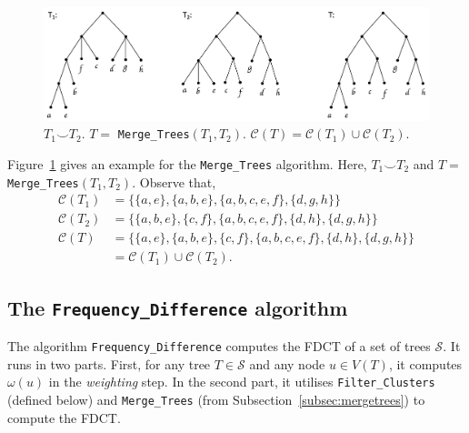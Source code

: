 \documentclass{article}
\newcommand{\compatible}{\smile}
\newcommand{\weight}{\omega}
\begin{document}
    \begin{figure}[ht]
        \includegraphics[scale=0.5]{mergetrees}
        \centering
        \caption{$T_1 \compatible T_2$. $T =$ \texttt{Merge\_Trees}$(T_1, T_2)$. $\mathcal{C}(T) = \mathcal{C}(T_1) \cup \mathcal{C}(T_2)$.}
        \label{fig:mergetrees}
    \end{figure}

    Figure~\ref{fig:mergetrees} gives an example for the \texttt{Merge\_Trees} algorithm. Here, $T_1 \compatible T_2$ and $T =$ \texttt{Merge\_Trees}$(T_1, T_2)$. Observe that,
    \begin{align*}
        \mathcal{C}(T_1) &= \{\{a, e\}, \{a, b, e\}, \{a, b, c, e, f\}, \{d, g, h\}\}\\
        \mathcal{C}(T_2) &= \{\{a, b, e\}, \{c, f\}, \{a, b, c, e, f\}, \{d, h\}, \{d, g, h\}\}\\
        \mathcal{C}(T) &= \{\{a, e\}, \{a, b, e\}, \{c, f\}, \{a, b, c, e, f\}, \{d, h\}, \{d, g, h\}\}\\
        &= \mathcal{C}(T_1) \cup \mathcal{C}(T_2).
    \end{align*}

    \subsection{The \texttt{Frequency\_Difference} algorithm}

    The algorithm \texttt{Frequency\_Difference} \cite{jansson2018algorithms} computes the FDCT of a set of trees $\mathcal{S}$. It runs in two parts. First, for any tree $T \in \mathcal{S}$ and any node $u \in V(T)$, it computes $\weight(u)$ in the \textit{weighting} step. In the second part, it utilises \texttt{Filter\_Clusters} (defined below) and \texttt{Merge\_Trees} (from Subsection~\ref{subsec:mergetrees}) to compute the FDCT.
\end{document}
